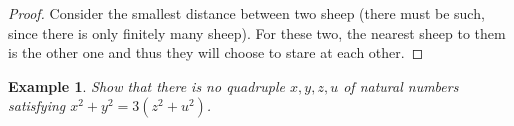 \documentclass[12pt]{article}
\newtheorem{theorem}{Example}
\begin{document}
\begin{proof}
Consider the smallest distance between two sheep (there must be such, since there is only finitely many sheep). For these two, the nearest sheep to them is the other one and thus they will choose to stare at each other.
\end{proof}



\begin{theorem} 
Show that there is no quadruple $x, y, z, u$ of natural numbers satisfying
$x^{2} + y^{2} = 3(z^{2} + u^{2})$.
\end{theorem}
\end{document}

